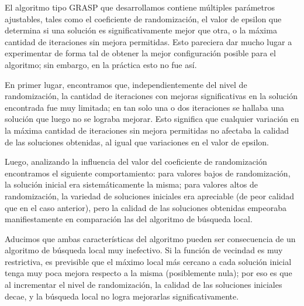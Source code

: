 El algoritmo tipo GRASP que desarrollamos contiene múltiples parámetros ajustables, tales como el coeficiente de randomización, el valor de epsilon que determina si una solución es significativamente mejor que otra, o la máxima cantidad de iteraciones sin mejora permitidas. Esto pareciera dar mucho lugar a experimentar de forma tal de obtener la mejor configuración posible para el algoritmo; sin embargo, en la práctica esto no fue así.

En primer lugar, encontramos que, independientemente del nivel de randomización, la cantidad de iteraciones con mejoras significativas en la solución encontrada fue muy limitada; en tan solo una o dos iteraciones se hallaba una solución que luego no se lograba mejorar. Esto significa que cualquier variación en la máxima cantidad de iteraciones sin mejora permitidas no afectaba la calidad de las soluciones obtenidas, al igual que variaciones en el valor de epsilon.

Luego, analizando la influencia del valor del coeficiente de randomización encontramos el siguiente comportamiento: para valores bajos de randomización, la solución inicial era sistemáticamente la misma; para valores altos de randomización, la variedad de soluciones iniciales era apreciable (de peor calidad que en el caso anterior), pero la calidad de las soluciones obtenidas empeoraba manifiestamente en comparación las del algoritmo de búsqueda local.

Aducimos que ambas características del algoritmo pueden ser consecuencia de un algoritmo de búsqueda local muy inefectivo. Si la función de vecindad es muy restrictiva, es previsible que el máximo local más cercano a cada solución inicial tenga muy poca mejora respecto a la misma (posiblemente nula); por eso es que al incrementar el nivel de randomización, la calidad de las soluciones iniciales decae, y la búsqueda local no logra mejorarlas significativamente.



